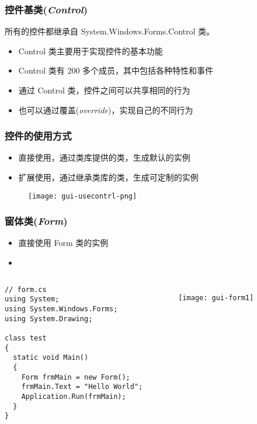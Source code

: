 \begin{frame}[fragile]
\frametitle{控件基类(\textit{Control})}
所有的控件都继承自 System.Windows.Forms.Control 类。
\begin{itemize}
\item Control 类主要用于实现控件的基本功能
\item Control 类有 200 多个成员，其中包括各种特性和事件
\item 通过 Control 类，控件之间可以共享相同的行为
\item 也可以通过{\redwarn 覆盖}(\textit{override})，实现自己的不同行为
\end{itemize}
\begin{figure}[htbp]
  \centering
  
\end{figure}
\end{frame}

\begin{frame}[fragile]
\frametitle{控件的使用方式}
\begin{itemize}
\item 直接使用，通过类库提供的类，生成默认的实例
\item 扩展使用，通过继承类库的类，生成可定制的实例
\end{itemize}
\begin{figure}[htbp]
  \centering
  \texttt{[image: gui-usecontrl-png]}
\end{figure}
\end{frame}

\begin{frame}[fragile]
\frametitle{窗体类(\textit{Form})}
\begin{itemize}
\item 直接使用 Form 类的实例
\item {}
\end{itemize}
\begin{columns}[t]
\begin{lstlisting}
// form.cs
using System;
using System.Windows.Forms;
using System.Drawing;

class test
{
  static void Main()
  {
    Form frmMain = new Form();
    frmMain.Text = "Hello World";
    Application.Run(frmMain);
  }
}
\end{lstlisting}
\begin{figure}[htbp]
  \centering
  \texttt{[image: gui-form1]}
\end{figure}
\end{columns}
\end{frame}

